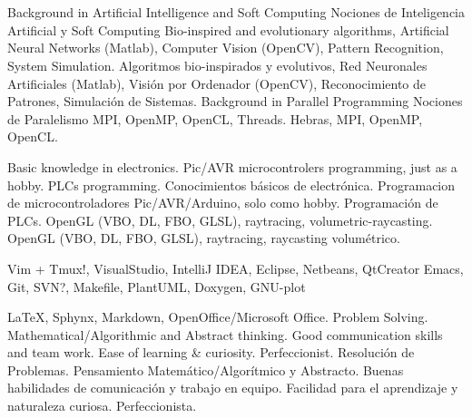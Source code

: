 \section{}

\cvcomputer
    {\ml
    {Background in Artificial Intelligence and Soft Computing}
    {Nociones de Inteligencia Artificial y Soft Computing}}
        {\ml
        {Bio-inspired and evolutionary algorithms, Artificial Neural Networks
        (Matlab), Computer Vision (OpenCV), Pattern Recognition, System
        Simulation.}
        {Algoritmos bio-inspirados y evolutivos, Red Neuronales Artificiales
        (Matlab), Visión por Ordenador (OpenCV), Reconocimiento de Patrones,
        Simulación de Sistemas.}}
    {\ml
    {Background in Parallel Programming}
    {Nociones de Paralelismo}}
        {\ml
        {MPI, OpenMP, OpenCL, Threads.}
        {Hebras, MPI, OpenMP, OpenCL.}}


\cvcomputer
    {}
        {\ml
        {Basic knowledge in electronics. Pic/AVR microcontrolers programming,
        just as a hobby. PLCs programming.}
        {Conocimientos básicos de electrónica. Programacion de
        microcontroladores Pic/AVR/Arduino, solo como hobby. Programación de
        PLCs.}}
    {}
        {\ml
        {OpenGL (VBO, DL, FBO, GLSL), raytracing, volumetric-raycasting.}
        {OpenGL (VBO, DL, FBO, GLSL), raytracing, raycasting volumétrico.}}


\cvcomputer
    {}
        {Vim + Tmux!, VisualStudio, IntelliJ IDEA, Eclipse, Netbeans,
        QtCreator}
    {}
        {Emacs, Git, SVN?, Makefile, PlantUML, Doxygen, GNU-plot}

\cvcomputer
    {}
        {\LaTeX, Sphynx, Markdown,  OpenOffice/Microsoft Office.}
    {}
        {\ml
        {Problem Solving. Mathematical/Algorithmic and Abstract thinking. Good
        communication skills and team work. Ease of learning \& curiosity.
        Perfeccionist.}
        {Resolución de Problemas. Pensamiento Matemático/Algorítmico y
        Abstracto. Buenas habilidades de comunicación y trabajo en equipo.
        Facilidad para el aprendizaje y naturaleza curiosa.  Perfeccionista.}}
